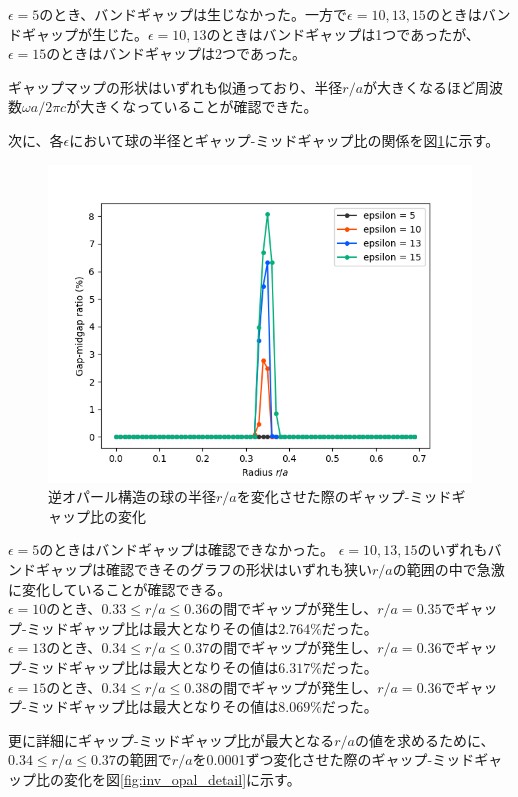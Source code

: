\documentclass[platex,dvipdfmx]{jsreport}
\numberwithin{equation}{section}
\begin{document}
$\epsilon = 5$のとき、バンドギャップは生じなかった。一方で$\epsilon = 10, 13, 15$のときはバンドギャップが生じた。$\epsilon = 10, 13$のときはバンドギャップは1つであったが、$\epsilon = 15$のときはバンドギャップは2つであった。

ギャップマップの形状はいずれも似通っており、半径$r / a$が大きくなるほど周波数$\omega a / 2 \pi c$が大きくなっていることが確認できた。

次に、各$\epsilon$において球の半径とギャップ-ミッドギャップ比の関係を図\ref{fig:inv_opal}に示す。

  
\begin{figure}[htbp]
  \centering
  \includegraphics[width=0.8\linewidth]{results/gap_midgap_ratio/inv_opals.png}
  \caption{逆オパール構造の球の半径$r / a$を変化させた際のギャップ-ミッドギャップ比の変化}
  \label{fig:inv_opal}
\end{figure}

$\epsilon = 5$のときはバンドギャップは確認できなかった。
$\epsilon = 10, 13, 15$のいずれもバンドギャップは確認できそのグラフの形状はいずれも狭い$r / a$の範囲の中で急激に変化していることが確認できる。
\\
$\epsilon = 10$のとき、$0.33 \leq r / a \leq 0.36$の間でギャップが発生し、$r / a = 0.35$でギャップ-ミッドギャップ比は最大となりその値は$2.764 \%$だった。
\\
$\epsilon = 13$のとき、$0.34 \leq r / a \leq 0.37$の間でギャップが発生し、$r / a = 0.36$でギャップ-ミッドギャップ比は最大となりその値は$6.317 \%$だった。
\\
$\epsilon = 15$のとき、$0.34 \leq r / a \leq 0.38$の間でギャップが発生し、$r / a = 0.36$でギャップ-ミッドギャップ比は最大となりその値は$8.069 \%$だった。

更に詳細にギャップ-ミッドギャップ比が最大となる$r / a$の値を求めるために、$0.34 \leq r / a \leq 0.37$の範囲で$r / a$を0.0001ずつ変化させた際のギャップ-ミッドギャップ比の変化を図\ref{fig:inv_opal_detail}に示す。
\end{document}
